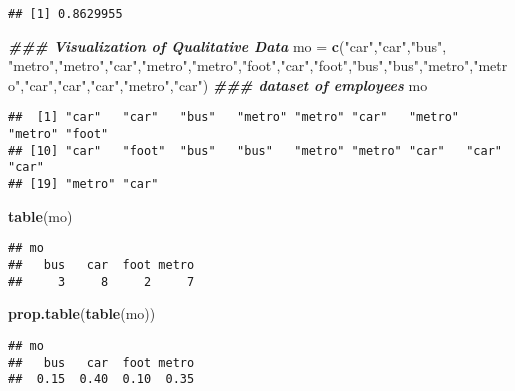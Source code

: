 \documentclass[
]{article}
\newenvironment{Shaded}{\begin{snugshade}}{\end{snugshade}}
\newcommand{\DocumentationTok}[1]{\textcolor[rgb]{0.56,0.35,0.01}{\textbf{\textit{#1}}}}
\newcommand{\FunctionTok}[1]{\textcolor[rgb]{0.13,0.29,0.53}{\textbf{#1}}}
\newcommand{\NormalTok}[1]{#1}
\newcommand{\OtherTok}[1]{\textcolor[rgb]{0.56,0.35,0.01}{#1}}
\newcommand{\StringTok}[1]{\textcolor[rgb]{0.31,0.60,0.02}{#1}}
\begin{document}
\begin{verbatim}
## [1] 0.8629955
\end{verbatim}

\begin{Shaded}
\begin{Highlighting}[]
\DocumentationTok{\#\#\# Visualization of Qualitative Data}
\NormalTok{mo }\OtherTok{=} \FunctionTok{c}\NormalTok{(}\StringTok{"car"}\NormalTok{,}\StringTok{"car"}\NormalTok{,}\StringTok{"bus"}\NormalTok{, }\StringTok{"metro"}\NormalTok{,}\StringTok{"metro"}\NormalTok{,}\StringTok{"car"}\NormalTok{,}\StringTok{"metro"}\NormalTok{,}\StringTok{"metro"}\NormalTok{,}\StringTok{"foot"}\NormalTok{,}\StringTok{"car"}\NormalTok{,}\StringTok{"foot"}\NormalTok{,}\StringTok{"bus"}\NormalTok{,}\StringTok{"bus"}\NormalTok{,}\StringTok{"metro"}\NormalTok{,}\StringTok{"metro"}\NormalTok{,}\StringTok{"car"}\NormalTok{,}\StringTok{"car"}\NormalTok{,}\StringTok{"car"}\NormalTok{,}\StringTok{"metro"}\NormalTok{,}\StringTok{"car"}\NormalTok{) }\DocumentationTok{\#\#\# dataset of employee\textquotesingle{}s }
\NormalTok{mo}
\end{Highlighting}
\end{Shaded}

\begin{verbatim}
##  [1] "car"   "car"   "bus"   "metro" "metro" "car"   "metro" "metro" "foot" 
## [10] "car"   "foot"  "bus"   "bus"   "metro" "metro" "car"   "car"   "car"  
## [19] "metro" "car"
\end{verbatim}

\begin{Shaded}
\begin{Highlighting}[]
\FunctionTok{table}\NormalTok{(mo)}
\end{Highlighting}
\end{Shaded}

\begin{verbatim}
## mo
##   bus   car  foot metro 
##     3     8     2     7
\end{verbatim}

\begin{Shaded}
\begin{Highlighting}[]
\FunctionTok{prop.table}\NormalTok{(}\FunctionTok{table}\NormalTok{(mo))}
\end{Highlighting}
\end{Shaded}

\begin{verbatim}
## mo
##   bus   car  foot metro 
##  0.15  0.40  0.10  0.35
\end{verbatim}
\end{document}
